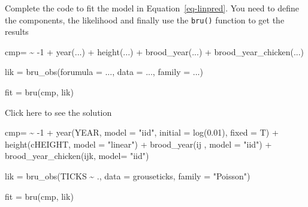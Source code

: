 \documentclass[
  letterpaper,
  DIV=11,
  numbers=noendperiod]{scrartcl}
\newenvironment{Shaded}{\begin{snugshade}}{\end{snugshade}}
\newcommand{\AttributeTok}[1]{\textcolor[rgb]{0.40,0.45,0.13}{#1}}
\newcommand{\DecValTok}[1]{\textcolor[rgb]{0.68,0.00,0.00}{#1}}
\newcommand{\ErrorTok}[1]{\textcolor[rgb]{0.68,0.00,0.00}{#1}}
\newcommand{\FloatTok}[1]{\textcolor[rgb]{0.68,0.00,0.00}{#1}}
\newcommand{\FunctionTok}[1]{\textcolor[rgb]{0.28,0.35,0.67}{#1}}
\newcommand{\NormalTok}[1]{\textcolor[rgb]{0.00,0.23,0.31}{#1}}
\newcommand{\OtherTok}[1]{\textcolor[rgb]{0.00,0.23,0.31}{#1}}
\newcommand{\SpecialCharTok}[1]{\textcolor[rgb]{0.37,0.37,0.37}{#1}}
\newcommand{\StringTok}[1]{\textcolor[rgb]{0.13,0.47,0.30}{#1}}
\begin{document}
\begin{tcolorbox}[enhanced jigsaw, opacityback=0, opacitybacktitle=0.6, bottomtitle=1mm, colbacktitle=quarto-callout-warning-color!10!white, breakable, titlerule=0mm, leftrule=.75mm, arc=.35mm, toptitle=1mm, title={Task}, toprule=.15mm, rightrule=.15mm, colframe=quarto-callout-warning-color-frame, bottomrule=.15mm, colback=white, coltitle=black, left=2mm]

Complete the code to fit the model in Equation~\ref{eq-linpred}. You
need to define the components, the likelihood and finally use the
\texttt{bru()} function to get the results

\begin{Shaded}
\begin{Highlighting}[]
\NormalTok{cmp}\OtherTok{=} \ErrorTok{\textasciitilde{}} \SpecialCharTok{{-}}\DecValTok{1} \SpecialCharTok{+} \FunctionTok{year}\NormalTok{(...) }\SpecialCharTok{+}
  \FunctionTok{height}\NormalTok{(...) }\SpecialCharTok{+} 
  \FunctionTok{brood\_year}\NormalTok{(...) }\SpecialCharTok{+}
  \FunctionTok{brood\_year\_chicken}\NormalTok{(...)}

\NormalTok{lik }\OtherTok{=} \FunctionTok{bru\_obs}\NormalTok{(}\AttributeTok{forumula =}\NormalTok{ ...,}
              \AttributeTok{data =}\NormalTok{ ...,}
              \AttributeTok{family =}\NormalTok{ ...)}

\NormalTok{fit }\OtherTok{=} \FunctionTok{bru}\NormalTok{(cmp, lik)}
\end{Highlighting}
\end{Shaded}

Click here to see the solution

\begin{Shaded}
\begin{Highlighting}[]
\NormalTok{cmp}\OtherTok{=} \ErrorTok{\textasciitilde{}} \SpecialCharTok{{-}}\DecValTok{1} \SpecialCharTok{+} \FunctionTok{year}\NormalTok{(YEAR, }\AttributeTok{model =} \StringTok{"iid"}\NormalTok{, }\AttributeTok{initial =} \FunctionTok{log}\NormalTok{(}\FloatTok{0.01}\NormalTok{), }\AttributeTok{fixed =}\NormalTok{ T) }\SpecialCharTok{+}
  \FunctionTok{height}\NormalTok{(cHEIGHT, }\AttributeTok{model =}  \StringTok{"linear"}\NormalTok{) }\SpecialCharTok{+} 
  \FunctionTok{brood\_year}\NormalTok{(ij , }\AttributeTok{model =} \StringTok{"iid"}\NormalTok{) }\SpecialCharTok{+}
  \FunctionTok{brood\_year\_chicken}\NormalTok{(ijk, }\AttributeTok{model=} \StringTok{"iid"}\NormalTok{)}

\NormalTok{lik }\OtherTok{=} \FunctionTok{bru\_obs}\NormalTok{(TICKS }\SpecialCharTok{\textasciitilde{}}\NormalTok{ .,}
              \AttributeTok{data =}\NormalTok{ grouseticks,}
              \AttributeTok{family =} \StringTok{"Poisson"}\NormalTok{)}

  
\NormalTok{fit }\OtherTok{=} \FunctionTok{bru}\NormalTok{(cmp, lik)}
\end{Highlighting}
\end{Shaded}

\end{tcolorbox}
\end{document}
